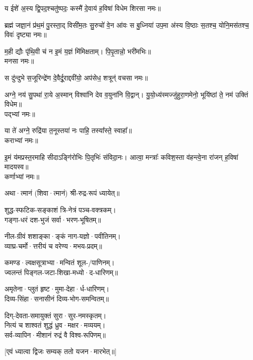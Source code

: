 {य ईशे॑ अ॒स्य द्वि॒पद॒श्चतु॑ष्पदः॒ कस्मै॑ दे॒वाय॑ ह॒विषा॑ विधेम}
शिरसा नमः॥

\twolineshloka
{ब्रह्म॑ जज्ञा॒नं प्र॑थ॒मं पु॒रस्ता॒द् विसी॑म॒तः सु॒रुचो॑ वे॒न आ॑वः}
{स बु॒ध्निया॑ उप॒मा अ॑स्य वि॒ष्ठाः स॒तश्च॒ योनि॒मस॑तश्च॒ विवः॑}
दृष्ट्या नमः॥

म॒ही द्यौः पृ॑थि॒वी च॑ न इ॒मं य॒ज्ञं मि॑मिक्षताम्। पि॒पृ॒तान्नो॒ भरी॑मभिः॥\\
मनसा नमः॥

{स दु॑न्दुभे स॒जूरिन्द्रे॑ण दे॒वैर्दू॒राद्दवी॑यो॒ अप॑सेध॒ शत्रून्॑}
वचसा नमः॥

अग्ने॒ नय॑ सु॒पथा॑ रा॒ये अ॒स्मान् विश्वा॑नि देव व॒युना॑नि वि॒द्वान्।
यु॒यो॒ध्य॑स्मज्जु॑हुरा॒णमेनो॒ भूयि॑ष्ठां ते॒ नम॑ उक्तिं विधेम॥\\
पद्भ्यां नमः॥

या ते॑ अग्ने॒ रुद्रि॑या त॒नूस्तया॑ नः पाहि॒ तस्या᳚स्ते॒ स्वाहा᳚॥\\
कराभ्यां नमः॥

इ॒मं य॑मप्रस्त॒रमाहि सीदाऽङ्गि॑रोभिः पि॒तृभिः॑ संविदा॒नः। आत्वा॒ मन्त्राः᳚ कविश॒स्ता व॑हन्त्वे॒ना रा॑जन् ह॒विषा॑ मादयस्व॥\\
कर्णाभ्यां नमः॥
{\small \closesection}

अथा·त्मानं (शिवा·त्मानं) श्री-रुद्र-रूपं ध्यायेत्॥

शुद्ध-स्फटिक-सङ्काशं त्रि-नेत्रं पञ्च-वक्त्रकम्।\\
गङ्गा-धरं दश-भुजं सर्वा·भरण-भूषितम्॥

नील-ग्रीवं शशाङ्का·ङ्कं नाग-यज्ञो·पवीतिनम्।\\
व्याघ्र-चर्मो·त्तरीयं च वरेण्य·मभय-प्रदम्॥

कमण्ड·ल्वक्षसूत्राभ्या·मन्वितं शूल-/पाणिनम्।\\
ज्वलन्तं पिङ्गल-जटा-शिखा-मध्यो·द-धारिणम्॥

अमृतेना·प्लुतं हृष्ट·मुमा-देहा·र्ध-धारिणम्।\\
दिव्य-सिंहा·सनासीनं दिव्य-भोग-समन्वितम्॥

दिग्-देवता-समायुक्तं सुरा·सुर-नमस्कृतम्।\\
नित्यं च शाश्वतं शुद्धं ध्रुव·मक्षर·मव्ययम्।\\
सर्व-व्यापिन·मीशानं रुद्रं वै विश्व-रूपिणम्॥

[एवं ध्यात्वा द्विजः सम्यक् ततो यजन·मारभेत्॥]


